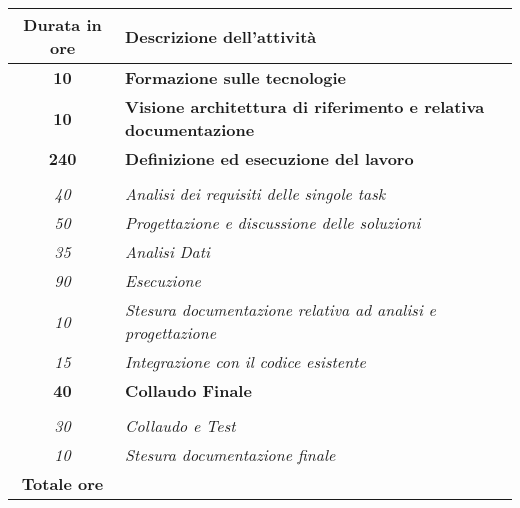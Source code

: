 

\begin{tabularx}{\textwidth}{|c|X|}
	\hline
	\textbf{Durata in ore} & \textbf{Descrizione dell'attività} \\\hline
	
	\textbf{10} & \textbf{Formazione sulle tecnologie} \\	 
    \hline
   	\textbf{10} & \textbf{Visione architettura di riferimento e relativa documentazione} \\	 
    \hline
    
    \textbf{240} & \textbf{Definizione ed esecuzione del lavoro} \\ \hdashline 
    \multirow{3}{0cm}\\ 
    \textit{40} & 
    \textit{Analisi dei requisiti delle singole task} \\
    \textit{50} & 
    \textit{Progettazione e discussione delle soluzioni} \\
    \textit{35} & 
    \textit{Analisi Dati} \\
    \textit{90} & 
    \textit{Esecuzione} \\
    \textit{10} & 
    \textit{Stesura documentazione relativa ad analisi e progettazione} \\
    \textit{15} & 
    \textit{Integrazione con il codice esistente} \\
    \hline

    \textbf{40} & \textbf{Collaudo Finale}  \\ \hdashline 
    \multirow{4}{0cm}\\ 
    \textit{30} & 
    \textit{Collaudo e Test} \\
    \textit{10} & 
    \textit{Stesura documentazione finale} \\
    \hline
	
	\textbf{Totale ore} & \multicolumn{1}{|c|}{\textbf{\totaleOre}} \\\hline
	
	
\end{tabularx}